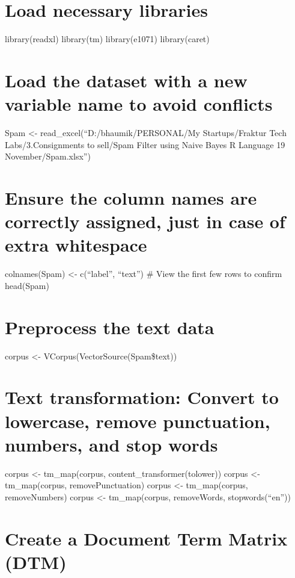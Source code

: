 \documentclass[
]{article}
\author{}
\date{\vspace{-2.5em}}
\begin{document}
\section{Load necessary libraries}\label{load-necessary-libraries}

library(readxl) library(tm) library(e1071) library(caret)

\section{Load the dataset with a new variable name to avoid
conflicts}\label{load-the-dataset-with-a-new-variable-name-to-avoid-conflicts}

Spam \textless- read\_excel(``D:/bhaumik/PERSONAL/My Startups/Fraktur
Tech Labs/3.Consignments to sell/Spam Filter using Naive Bayes R
Language 19 November/Spam.xlsx'')

\section{Ensure the column names are correctly assigned, just in case of
extra
whitespace}\label{ensure-the-column-names-are-correctly-assigned-just-in-case-of-extra-whitespace}

colnames(Spam) \textless- c(``label'', ``text'') \# View the first few
rows to confirm head(Spam)

\section{Preprocess the text data}\label{preprocess-the-text-data}

corpus \textless- VCorpus(VectorSource(Spam\$text))

\section{Text transformation: Convert to lowercase, remove punctuation,
numbers, and stop
words}\label{text-transformation-convert-to-lowercase-remove-punctuation-numbers-and-stop-words}

corpus \textless- tm\_map(corpus, content\_transformer(tolower)) corpus
\textless- tm\_map(corpus, removePunctuation) corpus \textless-
tm\_map(corpus, removeNumbers) corpus \textless- tm\_map(corpus,
removeWords, stopwords(``en''))

\section{Create a Document Term Matrix
(DTM)}\label{create-a-document-term-matrix-dtm}
\end{document}
